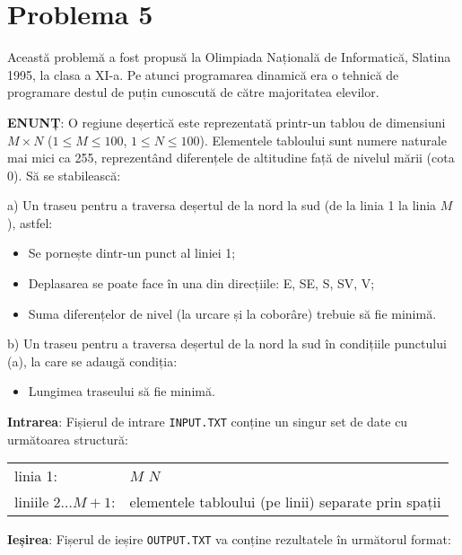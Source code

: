 \section{Problema 5}

Această problemă a fost propusă la Olimpiada Națională de Informatică, Slatina
1995, la clasa a XI-a. Pe atunci programarea dinamică era o tehnică de
programare destul de puțin cunoscută de către majoritatea elevilor.

{\bf ENUNȚ}: O regiune deșertică este reprezentată printr-un tablou de
dimensiuni $M \times N$ ($1 \leq M \leq 100$, $1 \leq N \leq 100$). Elementele
tabloului sunt numere naturale mai mici ca 255, reprezentând diferențele de
altitudine față de nivelul mării (cota 0). Să se stabilească:

a) Un traseu pentru a traversa deșertul de la nord la sud (de la linia 1 la
linia $M$), astfel:

\begin{itemize}

\item Se pornește dintr-un punct al liniei 1;

\item Deplasarea se poate face în una din direcțiile: E, SE, S, SV, V;

\item Suma diferențelor de nivel (la urcare și la coborâre) trebuie să fie
  minimă.

\end{itemize}

b) Un traseu pentru a traversa deșertul de la nord la sud în condițiile
punctului (a), la care se adaugă condiția:

\begin{itemize}

\item Lungimea traseului să fie minimă.

\end{itemize}

{\bf Intrarea}: Fișierul de intrare {\tt INPUT.TXT} conține un singur set de
date cu următoarea structură:

\begin{tabular}{ll}
  linia 1: & $M$ $N$ \\
  liniile $2 \dots M + 1$: & elementele tabloului (pe linii) separate prin spații \\
\end{tabular}

{\bf Ieșirea}: Fișerul de ieșire {\tt OUTPUT.TXT} va conține rezultatele în
următorul format:

